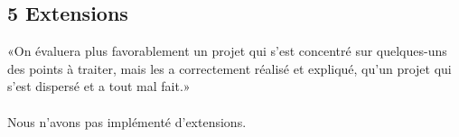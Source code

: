 \documentclass{article}
\begin{document}
{}
{}

\subsection{5 Extensions }
«On évaluera plus favorablement un projet qui s'est concentré sur quelques-uns
des points à traiter, mais les a correctement réalisé et expliqué, qu'un
projet qui s'est dispersé et a tout mal fait.»
\\
\\
Nous n'avons pas implémenté d'extensions.
\end{document}

